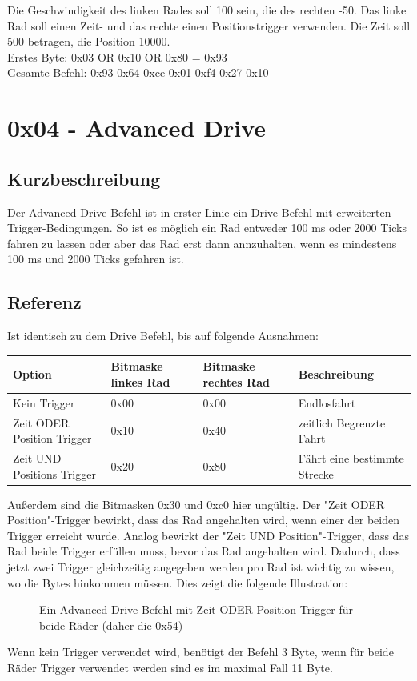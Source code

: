 \documentclass[a4paper]{article}
\begin{document}
	Die Geschwindigkeit des linken Rades soll 100 sein, die des rechten -50. Das linke Rad soll einen Zeit- und das
	rechte einen Positionstrigger verwenden. Die Zeit soll 500 betragen, die Position 10000.\\
	Erstes Byte: 0x03 OR 0x10 OR 0x80 = 0x93\\
	Gesamte Befehl: 0x93 0x64 0xce 0x01 0xf4 0x27 0x10
	\pagebreak


	\section{0x04 - Advanced Drive}

	\subsection{Kurzbeschreibung}

	Der Advanced-Drive-Befehl ist in erster Linie ein Drive-Befehl mit erweiterten Trigger-Bedingungen. So ist es möglich
	ein Rad entweder 100 ms oder 2000 Ticks fahren zu lassen oder aber das Rad erst dann annzuhalten, wenn es mindestens
	100 ms und 2000 Ticks gefahren ist.

	\subsection{Referenz}

	Ist identisch zu dem Drive Befehl, bis auf folgende Ausnahmen:
	
	\begin{tabularx}{\linewidth}{|l|l|l|X|}
		\hline
		\textbf{Option} & \textbf{Bitmaske linkes Rad} & \textbf{Bitmaske rechtes Rad} & \textbf{Beschreibung} \\
		\hline
		\hline
		Kein Trigger				& 0x00						   & 0x00						   & Endlosfahrt \\
		\hline
		Zeit ODER Position Trigger	& 0x10						   & 0x40						   & zeitlich Begrenzte Fahrt\\
		\hline
		Zeit UND Positions Trigger  & 0x20						   & 0x80						   & Fährt eine bestimmte Strecke \\
		\hline
	\end{tabularx}

	Außerdem sind die Bitmasken 0x30 und 0xc0 hier ungültig. Der "Zeit ODER Position"-Trigger bewirkt, dass das Rad angehalten
	wird, wenn einer der beiden Trigger erreicht wurde. Analog bewirkt der "Zeit UND Position"-Trigger, dass das Rad
	beide Trigger erfüllen muss, bevor das Rad angehalten wird. Dadurch, dass jetzt zwei Trigger gleichzeitig angegeben werden
	pro Rad ist wichtig zu wissen, wo die Bytes hinkommen müssen. Dies zeigt die folgende Illustration:
	\begin{figure}[!ht]
		\centering
		\caption{Ein Advanced-Drive-Befehl mit Zeit ODER Position Trigger für beide Räder (daher die 0x54)}
	\end{figure}
	Wenn kein Trigger verwendet wird, benötigt der Befehl 3 Byte, wenn für beide Räder Trigger verwendet werden sind es im
	maximal Fall 11 Byte.
\end{document}
